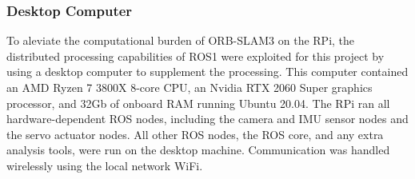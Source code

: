 \subsubsection{ Desktop Computer }
To aleviate the computational burden of ORB-SLAM3 on the RPi, the distributed processing capabilities of ROS1 were exploited for this project by using a desktop computer to supplement the processing. This computer contained an AMD Ryzen 7 3800X 8-core CPU, an Nvidia RTX 2060 Super graphics processor, and 32Gb of onboard RAM running Ubuntu 20.04. The RPi ran all hardware-dependent ROS nodes, including the camera and IMU sensor nodes and the servo actuator nodes. All other ROS nodes, the ROS core, and any extra analysis tools, were run on the desktop machine. Communication was handled wirelessly using the local network WiFi.